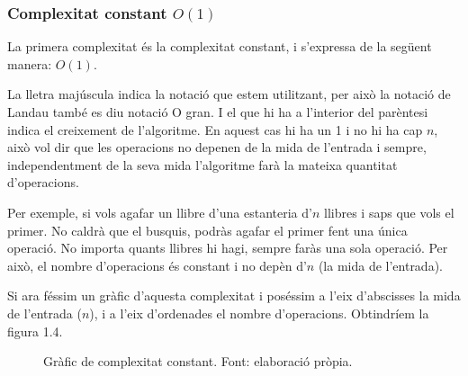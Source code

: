 
\subsubsection*{Complexitat constant $O(1)$}
La primera complexitat és la complexitat constant, i s'expressa de la següent manera: $O(1)$. 

La lletra  majúscula indica la notació que estem utilitzant, per això la notació de Landau també es diu notació O gran. I el que hi ha a l'interior del parèntesi indica el creixement de l'algoritme. En aquest cas hi ha un 1 i no hi ha cap $n$, això vol dir que les operacions no depenen de la mida de l'entrada i sempre, independentment de la seva mida l'algoritme farà la mateixa quantitat d'operacions.

Per exemple, si vols agafar un llibre d'una estanteria d'$n$ llibres i saps que vols el primer. No caldrà que el busquis, podràs agafar el primer fent una única operació. No importa quants llibres hi hagi, sempre faràs una sola operació. Per això, el nombre d'operacions és constant i no depèn d'$n$ (la mida de l'entrada).

Si ara féssim un gràfic d'aquesta complexitat i poséssim a l'eix d'abscisses la mida de l'entrada ($n$), i a l'eix d'ordenades el nombre d'operacions. Obtindríem la figura 1.4.

\begin{figure}[h]
    \centering
    \caption[Gràfic de complexitat constant.]{Gràfic de complexitat constant. Font: elaboració pròpia.}\label{fig:my_label}
\end{figure}

